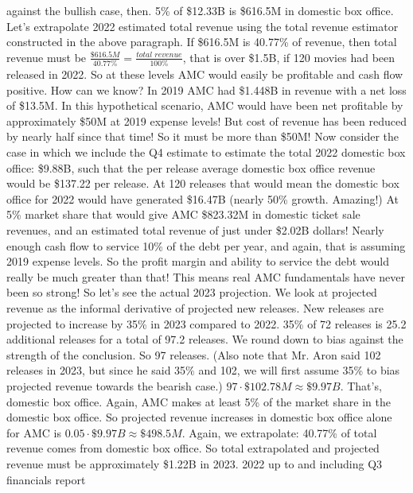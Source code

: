 \documentclass{article}
\begin{document}
against the bullish case, then. 5\% of \$12.33B is \$616.5M in domestic 
box office. Let's extrapolate 2022 estimated total revenue using the total revenue 
estimator constructed in the above paragraph. If \$616.5M is 40.77\% of revenue, 
then total revenue must be
$\frac{\$616.5M}{40.77\%} = \frac{\textit{total revenue}}{100\%}$, that is 
over \$1.5B, if 120 movies had been released in 2022. So at these levels 
AMC would easily be profitable and cash flow positive. How can we know? In 2019 
AMC had \$1.448B in revenue with a net loss of \$13.5M. In this hypothetical 
scenario, AMC would have been net profitable by approximately \$50M at 2019 
expense levels! But cost of revenue has been reduced by nearly half since that 
time! So it must be more than \$50M! Now consider the case in which we include 
the Q4 estimate to estimate the total 2022 domestic box office: \$9.88B, such 
that the per release average domestic box office revenue would be \$137.22 per 
release. At 120 releases that would mean the domestic box office for 2022 would 
have generated \$16.47B (nearly 50\% growth. Amazing!) At 5\% market share that 
would give AMC \$823.32M in domestic ticket sale revenues, and an estimated total 
revenue of just under \$2.02B dollars! Nearly enough cash flow to service 10\% of 
the debt per year, and again, that is assuming 2019 expense levels. So the profit 
margin and ability to service the debt would really be much greater than that!
This means real AMC fundamentals have never been so strong! 
\newline \newline
So let's see the actual 2023 projection. We look at projected revenue as the
informal derivative of projected new releases. New releases are projected to 
increase by 35\% in 2023 compared to 2022. 35\% of 72 releases is 25.2 additional 
releases for a total of 97.2 releases. We round down to bias against the strength 
of the conclusion. So 97 releases. (Also note that Mr. Aron said 102 releases in 
2023, 
but since he said 35\% and 102, we will first assume 35\% to bias projected 
revenue towards the bearish case.) $97 \cdot \$102.78M \approx \$9.97B$. 
That's, domestic box office. Again, AMC makes 
at least 5\% of the market share in the domestic box office. So projected 
revenue increases in domestic box office alone for AMC is $0.05 \cdot \$9.97B 
\approx \$498.5M$. Again, we extrapolate: 40.77\% of total revenue comes from 
domestic box office. So total extrapolated and projected revenue must be 
approximately \$1.22B in 2023. 2022 up to and including Q3 financials report 
\end{document}

